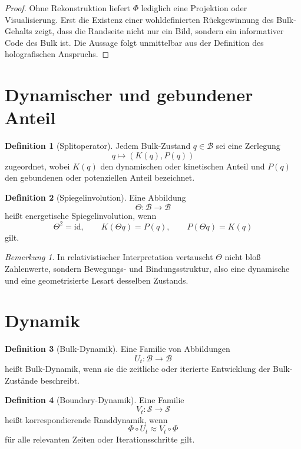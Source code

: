 \documentclass[11pt,a4paper]{article}
\theoremstyle{definition}
\newtheorem{definition}{Definition}
\theoremstyle{remark}
\newtheorem{bemerkung}{Bemerkung}
\begin{document}
\begin{proof}
Ohne Rekonstruktion liefert $\Phi$ lediglich eine Projektion oder Visualisierung. Erst die Existenz einer wohldefinierten Rückgewinnung des Bulk-Gehalts zeigt, dass die Randseite nicht nur ein Bild, sondern ein informativer Code des Bulk ist. Die Aussage folgt unmittelbar aus der Definition des holografischen Anspruchs.
\end{proof}

\section{Dynamischer und gebundener Anteil}

\begin{definition}[Splitoperator]
Jedem Bulk-Zustand $q\in\mathcal{B}$ sei eine Zerlegung
\[
q\mapsto (K(q),P(q))
\]
zugeordnet, wobei $K(q)$ den dynamischen oder kinetischen Anteil und $P(q)$ den gebundenen oder potenziellen Anteil bezeichnet.
\end{definition}

\begin{definition}[Spiegelinvolution]
Eine Abbildung
\[
\Theta:\mathcal{B}\to\mathcal{B}
\]
heißt energetische Spiegelinvolution, wenn
\[
\Theta^2=\mathrm{id},\qquad K(\Theta q)=P(q),\qquad P(\Theta q)=K(q)
\]
gilt.
\end{definition}

\begin{bemerkung}
In relativistischer Interpretation vertauscht $\Theta$ nicht bloß Zahlenwerte, sondern Bewegungs- und Bindungsstruktur, also eine dynamische und eine geometrisierte Lesart desselben Zustands.
\end{bemerkung}

\section{Dynamik}

\begin{definition}[Bulk-Dynamik]
Eine Familie von Abbildungen
\[
U_t:\mathcal{B}\to\mathcal{B}
\]
heißt Bulk-Dynamik, wenn sie die zeitliche oder iterierte Entwicklung der Bulk-Zustände beschreibt.
\end{definition}

\begin{definition}[Boundary-Dynamik]
Eine Familie
\[
V_t:\mathcal{S}\to\mathcal{S}
\]
heißt korrespondierende Randdynamik, wenn
\[
\Phi\circ U_t\approx V_t\circ\Phi
\]
für alle relevanten Zeiten oder Iterationsschritte gilt.
\end{definition}
\end{document}
